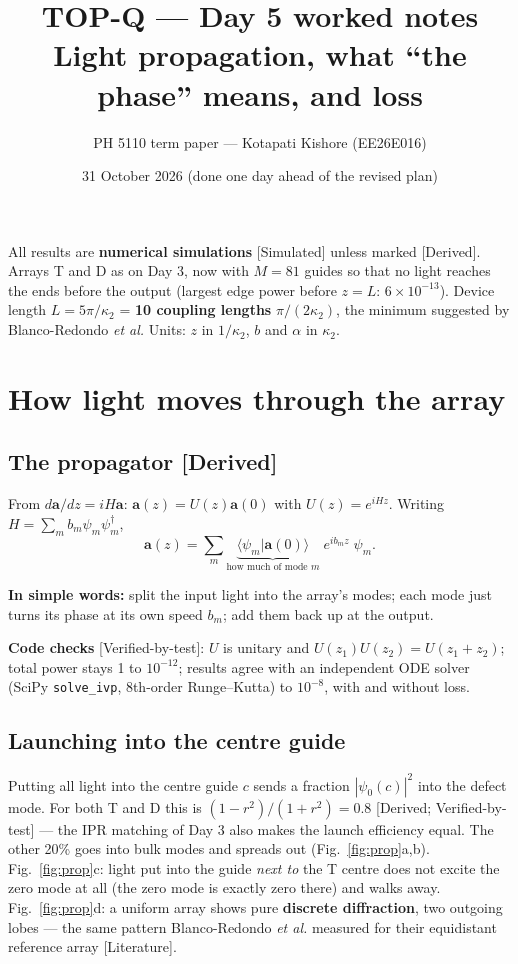 \documentclass[10pt,a4paper]{article}
\title{TOP-Q --- Day 5 worked notes\\[2pt]\large Light propagation, what ``the phase'' means, and loss}
\author{PH 5110 term paper --- Kotapati Kishore (EE26E016)}
\date{31 October 2026 (done one day ahead of the revised plan)}
\newcommand{\kc}{\kappa_2}
\newcommand{\note}[1]{\par\smallskip\noindent\colorbox{gray!12}{\parbox{\dimexpr\linewidth-2\fboxsep}{\small #1}}\par\smallskip}
\newcommand{\evd}[1]{\textsf{\small[#1]}}
\newcommand{\simple}[1]{\par\noindent\textbf{In simple words:} #1\par\smallskip}
\begin{document}
\sloppy\maketitle

\note{All results are \textbf{numerical simulations} \evd{Simulated} unless marked \evd{Derived}. Arrays T and D as on Day 3, now with $M=81$ guides so that no light reaches the ends before the output (largest edge power before $z=L$: $6\times10^{-13}$). Device length $L=5\pi/\kc$ = \textbf{10 coupling lengths} $\pi/(2\kc)$, the minimum suggested by Blanco-Redondo \emph{et al.} Units: $z$ in $1/\kc$, $b$ and $\alpha$ in $\kc$.}

\tableofcontents

\section{How light moves through the array}
\subsection{The propagator \evd{Derived}}
From $d\bm a/dz=iH\bm a$: $\bm a(z)=U(z)\bm a(0)$ with $U(z)=e^{iHz}$. Writing $H=\sum_m b_m\psi_m\psi_m^\dagger$,
\[
\bm a(z)=\sum_m\underbrace{\langle\psi_m|\bm a(0)\rangle}_{\text{how much of mode }m}\;e^{ib_mz}\;\psi_m .
\]
\simple{split the input light into the array's modes; each mode just turns its phase at its own speed $b_m$; add them back up at the output.}

\textbf{Code checks} \evd{Verified-by-test}: $U$ is unitary and $U(z_1)U(z_2)=U(z_1+z_2)$; total power stays 1 to $10^{-12}$; results agree with an independent ODE solver (SciPy \texttt{solve\_ivp}, 8th-order Runge--Kutta) to $10^{-8}$, with and without loss.

\subsection{Launching into the centre guide}
Putting all light into the centre guide $c$ sends a fraction $|\psi_0(c)|^2$ into the defect mode. For both T and D this is $(1-r^2)/(1+r^2)=0.8$ \evd{Derived; Verified-by-test} --- the IPR matching of Day 3 also makes the launch efficiency equal. The other 20\% goes into bulk modes and spreads out (Fig.~\ref{fig:prop}a,b).
Fig.~\ref{fig:prop}c: light put into the guide \emph{next to} the T centre does not excite the zero mode at all (the zero mode is exactly zero there) and walks away. Fig.~\ref{fig:prop}d: a uniform array shows pure \textbf{discrete diffraction}, two outgoing lobes --- the same pattern Blanco-Redondo \emph{et al.} measured for their equidistant reference array \evd{Literature}.
\end{document}
